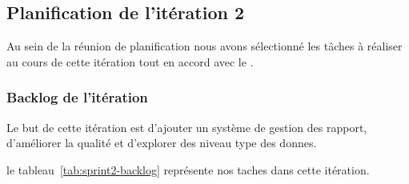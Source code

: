 

\subsection{Planification de l'itération 2}

Au sein de la réunion de planification nous avons sélectionné les tâches à
réaliser au cours de cette itération tout en accord avec le .

\subsubsection{Backlog de l'itération}
Le but de cette itération est d’ajouter un système de gestion des rapport, d’améliorer la qualité et d'explorer des niveau type des donnes.

le tableau~\ref{tab:sprint2-backlog} représente nos taches dans cette itération.

